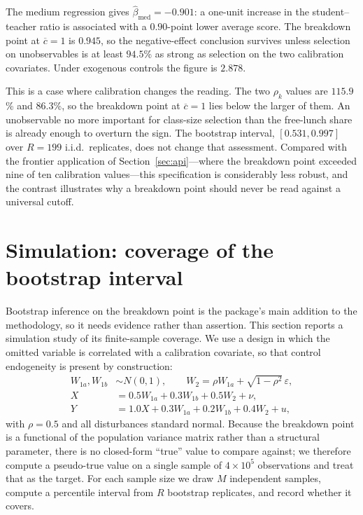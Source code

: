 \documentclass[article]{jss}\usepackage[]{graphicx}\usepackage[]{xcolor}
\newcommand{\bmed}{\beta_{\mathrm{med}}}
\newcommand{\cbar}{\ensuremath{\overline{c}}}
\begin{document}
The medium regression gives
$\hat\bmed = -0.901$: a one-unit increase in the
student--teacher ratio is associated with a
$0.90$-point lower average score. The
breakdown point at $\cbar = 1$ is
$0.945$, so the negative-effect conclusion survives
unless selection on unobservables is at least
$94.5$\% as strong as selection on the two
calibration covariates. Under exogenous controls the figure is
$2.878$.

This is a case where calibration changes the reading. The two $\rho_k$
values are $115.9$\% and
$86.3$\%, so the breakdown point at $\cbar = 1$
lies below the larger of them. An unobservable no more important for
class-size selection than the free-lunch share is already enough to
overturn the sign.
The bootstrap interval, $[0.531,
0.997]$ over $R = 199$ i.i.d.\ replicates, does
not change that assessment. Compared with the frontier application of
Section~\ref{sec:api}---where the breakdown point exceeded nine of ten
calibration values---this specification is considerably less robust, and
the contrast illustrates why a breakdown point should never be read against
a universal cutoff.

\section{Simulation: coverage of the bootstrap interval}\label{sec:case-sim}

Bootstrap inference on the breakdown point is the package's main addition
to the methodology, so it needs evidence rather than assertion. This
section reports a simulation study of its finite-sample coverage. We use a
design in which the omitted variable is correlated with a calibration
covariate, so that control endogeneity is present by construction:
\begin{align*}
W_{1a}, W_{1b} &\sim N(0, 1), \qquad
W_2 = \rho W_{1a} + \sqrt{1 - \rho^2}\, \varepsilon, \\
X &= 0.5 W_{1a} + 0.3 W_{1b} + 0.5 W_2 + \nu, \\
Y &= 1.0 X + 0.3 W_{1a} + 0.2 W_{1b} + 0.4 W_2 + u,
\end{align*}
with $\rho = 0.5$ and all disturbances standard normal. Because the
breakdown point is a functional of the population variance matrix rather
than a structural parameter, there is no closed-form ``true'' value to
compare against; we therefore compute a pseudo-true value on a single
sample of $4 \times 10^5$ observations and treat that as the target. For
each sample size we draw $M$ independent samples, compute a percentile
interval from $R$ bootstrap replicates, and record whether it covers.
\end{document}
